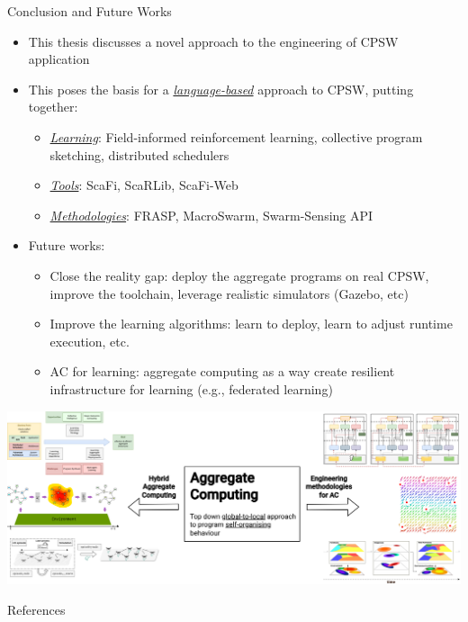 \documentclass[presentation, 8pt,169]{beamer}\mode<presentation>{\usetheme{AMSBolognaFC}}
\begin{document}
\begin{frame}{Conclusion and Future Works}
\begin{itemize}
  \item This thesis discusses a novel approach to the engineering of CPSW application
  \item This poses the basis for a \emph{\underline{language-based}} approach to CPSW, putting together:
  \begin{itemize}
    \item \emph{\underline{Learning}}: Field-informed reinforcement learning, collective program sketching, distributed schedulers
    \item \emph{\underline{Tools}}: ScaFi, ScaRLib, ScaFi-Web
    \item \emph{\underline{Methodologies}}: FRASP, MacroSwarm, Swarm-Sensing API
  \end{itemize}
  \item Future works:
  \begin{itemize}
    \item Close the reality gap: deploy the aggregate programs on real CPSW, improve the toolchain, leverage realistic simulators (Gazebo, etc)
    \item Improve the learning algorithms: learn to deploy, learn to adjust runtime execution, etc.
    \item AC for learning: aggregate computing as a way create resilient infrastructure for learning (e.g., federated learning)
  \end{itemize}
\end{itemize}
\end{frame}

\begin{frame}
\includegraphics[width=\textwidth]{img/contribution.drawio.png}
\end{frame}
\begin{frame}[allowframebreaks]{References}
  \def\bibfont{\footnotesize}
  \printbibliography
\end{frame}

\end{document}
